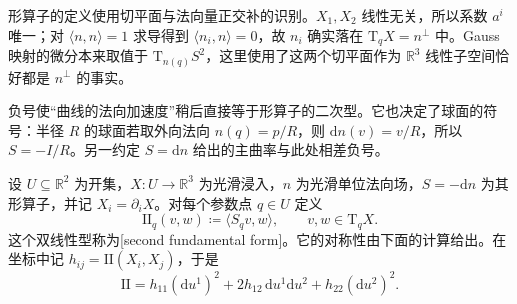 形算子的定义使用切平面与法向量正交补的识别。\(X_1,X_2\) 线性无关，所以系数 \(a^i\) 唯一；对 \(\langle n,n\rangle=1\) 求导得到 \(\langle n_i,n\rangle=0\)，故 \(n_i\) 确实落在 \(\mathrm{T}_qX=n^\perp\) 中。Gauss 映射的微分本来取值于 \(\mathrm{T}_{n(q)}S^2\)，这里使用了这两个切平面作为 \(\mathbb R^3\) 线性子空间恰好都是 \(n^\perp\) 的事实。

\ProseParagraphBreak

负号使“曲线的法向加速度”稍后直接等于形算子的二次型。它也决定了球面的符号：半径 \(R\) 的球面若取外向法向 \(n(q)=p/R\)，则 \(\mathrm dn(v)=v/R\)，所以 \(S=-I/R\)。另一约定 \(S=\mathrm dn\) 给出的主曲率与此处相差负号。

\begin{definition}[第二基本形式]\label{g1:def:second-fundamental-form}
	设 \(U\subseteq\mathbb R^2\) 为开集，\(X:U\to\mathbb R^3\) 为光滑浸入，\(n\) 为光滑单位法向场，\(S=-\mathrm{d}n\) 为其形算子，并记 \(X_i=\partial_iX\)。对每个参数点 \(q\in U\) 定义
	\[
		\mathrm{II}_q(v,w)\coloneqq\langle S_qv,w\rangle,\qquad v,w\in \mathrm{T}_qX.
	\]
	这个双线性型称为[second fundamental form]。它的对称性由下面的计算给出。在坐标中记 \(h_{ij}=\mathrm{II}(X_i,X_j)\)，于是
	\[
		\mathrm{II}=h_{11}(\mathrm du^1)^2+2h_{12}\,\mathrm du^1\mathrm du^2+h_{22}(\mathrm du^2)^2.
	\]
\end{definition}

